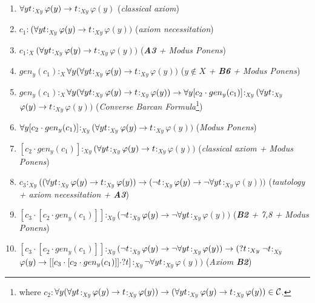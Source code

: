 \begin{enumerate}[1.]
\item $ \forall y t$$:_{Xy}$$\varphi(y) \rightarrow t$$:_{Xy}$$\varphi(y)$   (\textit{classical axiom})

\item $c_{1}$$:$$(\forall y t$$:_{Xy}$$\varphi(y) \rightarrow t$$:_{Xy}$$\varphi(y))$   (\textit{axiom necessitation})

\item $c_{1}$$:_{X}$$(\forall y t$$:_{Xy}$$\varphi(y) \rightarrow t$$:_{Xy}$$\varphi(y))$    (\textit{\textbf{A3} + Modus Ponens})




\item $gen_{y}(c_{1})$$:_{X}$$\forall y (\forall y t$$:_{Xy}$$\varphi(y) \rightarrow t$$:_{Xy}$$\varphi(y))$   (\textit{$y \notin X$ + \textbf{B6} + Modus Ponens})

\item $gen_{y}(c_{1})$$:_{X}$$\forall y (\forall y t$$:_{Xy}$$\varphi(y) \rightarrow t$$:_{Xy}$$\varphi(y)) \rightarrow \forall y [c_{2} \cdot gen_{y}(c_{1})]$$:_{Xy}$$ (\forall y t$$:_{Xy}$$\varphi(y) \rightarrow t$$:_{Xy}$$\varphi(y))$    (\textit{Converse Barcan Formula}\footnote{where $c_{2}$$:$$\forall y (\forall y t$$:_{Xy}$$\varphi(y) \rightarrow t$$:_{Xy}$$\varphi(y)) \rightarrow (\forall y t$$:_{Xy}$$\varphi(y) \rightarrow t$$:_{Xy}$$\varphi(y)) \in \mathcal{C}$.})

\item $\forall y [c_{2} \cdot gen_{y}(c_{1})]$$:_{Xy}$$ (\forall y t$$:_{Xy}$$\varphi(y) \rightarrow t$$:_{Xy}$$\varphi(y))$    (\textit{Modus Ponens})

\item $[c_{2} \cdot gen_{y}(c_{1})]$$:_{Xy}$$ (\forall y t$$:_{Xy}$$\varphi(y) \rightarrow t$$:_{Xy}$$\varphi(y))$    (\textit{classical axiom + Modus Ponens})

\item $c_{3}$$:_{Xy}$$((\forall y t$$:_{Xy}$$\varphi(y) \rightarrow t$$:_{Xy}$$\varphi(y)) \rightarrow (\neg t$$:_{Xy}$$\varphi(y) \rightarrow \neg \forall y t$$:_{Xy}$$\varphi(y)))$ (\textit{tautology + axiom necessitation + \textbf{A3}})

\item $[c_{3} \cdot [c_{2} \cdot gen_{y}(c_{1})]]$$:_{Xy}$$(\neg t$$:_{Xy}$$\varphi(y) \rightarrow \neg \forall y t$$:_{Xy}$$\varphi(y))$ (\textit{\textbf{B2} + 7,8 + Modus Ponens})

\item $[c_{3} \cdot [c_{2} \cdot gen_{y}(c_{1})]]$$:_{Xy}$$(\neg t$$:_{Xy}$$\varphi(y) \rightarrow \neg \forall y t$$:_{Xy}$$\varphi(y)) \rightarrow (?t$$:_{Xy}\neg t$$:_{Xy}$$\varphi(y) \rightarrow [[c_{3} \cdot [c_{2} \cdot gen_{y}(c_{1})]]\cdot ?t]$$:_{Xy}$$\neg \forall y t$$:_{Xy}$$\varphi(y)) $ (\textit{Axiom \textbf{B2}})



\end{enumerate}
